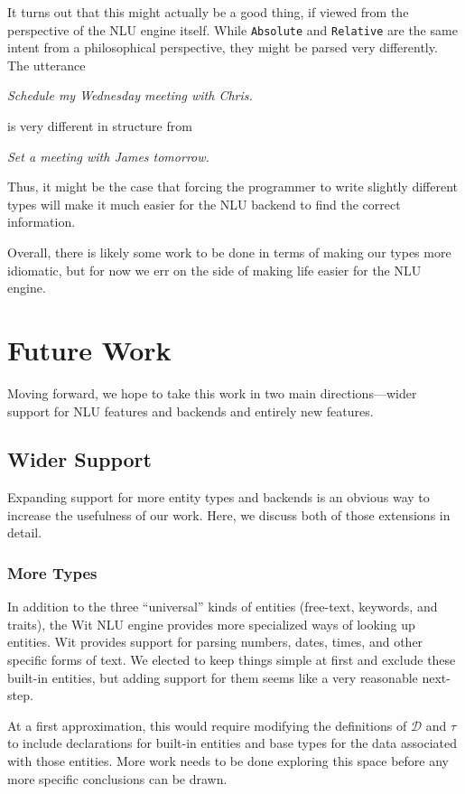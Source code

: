 \documentclass[twocolumn]{article}
\newcommand{\ts}[1]{\texttt{#1}}
\newcommand{\fcy}[1]{\mathcal{#1}}
\begin{document}
It turns out that this might actually be a good thing, if viewed from the
perspective of the NLU engine itself. While \ts{Absolute} and \ts{Relative} are
the same intent from a philosophical perspective, they might be parsed very
differently. The utterance
\begin{center}
  \emph{Schedule my Wednesday meeting with Chris.}
\end{center}
is very different in structure from
\begin{center}
  \emph{Set a meeting with James tomorrow.}
\end{center}
Thus, it might be the case that forcing the programmer to write slightly
different types will make it much easier for the NLU backend to find the correct
information.

Overall, there is likely some work to be done in terms of making our types more
idiomatic, but for now we err on the side of making life easier for the NLU
engine.

\section{Future Work} \label{future}
Moving forward, we hope to take this work in two main directions---wider support
for NLU features and backends and entirely new features.

\subsection{Wider Support}
Expanding support for more entity types and backends is an obvious way to
increase the usefulness of our work. Here, we discuss both of those extensions
in detail.

\subsubsection{More Types} \label{future>types}
In addition to the three ``universal'' kinds of entities (free-text, keywords,
and traits), the Wit NLU engine provides more specialized ways of looking up
entities. Wit provides support for parsing numbers, dates, times, and other
specific forms of text. We elected to keep things simple at first and exclude
these built-in entities, but adding support for them seems like a very
reasonable next-step.

At a first approximation, this would require modifying the definitions of
$\fcy{D}$ and $\tau$ to include declarations for built-in entities and
base types for the data associated with those entities. More work needs to be
done exploring this space before any more specific conclusions can be drawn.
\end{document}
